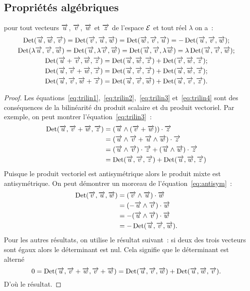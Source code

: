 \subsection{Propriétés algébriques}
\begin{prop}
  pour tout vecteurs \(\vu\), \(\vv\), \(\vw\) et \( \vz\) de l'espace \(\E\) 
  et tout réel \(\lambda\) on a~:
  \begin{gather}
    \Det(\vu, \vw, \vv) = \Det(\vv, \vu, \vw)=\Det(\vw, \vv, \vu) = -\Det(\vu, 
    \vv, \vw) \label{eq:antisym};\\
    \Det(\lambda\vu, \vv, \vw) = \Det(\vu, \lambda\vv, \vw) = \Det(\vu, \vv, 
    \lambda\vw) = \lambda\Det(\vu, \vv, \vw)\label{eq:trilin1};\\
    \Det(\vu + \vv, \vw, \vz) = \Det(\vu, \vw, \vz) + \Det(\vv, \vw, \vz) 
    \label{eq:trilin2};\\
    \Det(\vu, \vv + \vw, \vz) = \Det(\vu, \vv, \vz) + \Det(\vu, \vw, \vz) 
    \label{eq:trilin3};\\
    \Det(\vu, \vv, \vw + \vz) = \Det(\vu, \vv, \vw) + \Det(\vu, \vv, \vz) 
    \label{eq:trilin4}.
  \end{gather}
\end{prop}

\begin{proof}
  Les équations~\eqref{eq:trilin1},~\eqref{eq:trilin2},~\eqref{eq:trilin3} 
  et~\eqref{eq:trilin4} sont des conséquences de la bilinéarité du produit 
  scalaire et du produit vectoriel. Par exemple, on peut montrer 
  l'équation~\eqref{eq:trilin3}~:
  \begin{align}
    \Det(\vu, \vv + \vw, \vz)
    & = (\vu\wedge(\vv + \vw))\cdot\vz\\
    & = (\vu\wedge\vv + \vu\wedge\vw)\cdot\vz\\
    & = (\vu\wedge\vv)\cdot\vz + (\vu\wedge\vw)\cdot\vz\\
    & = \Det(\vu, \vv, \vz) + \Det(\vu, \vw, \vz)
  \end{align}
  Puisque le produit vectoriel est antisymétrique alors le produit mixte est 
  antisymétrique. On peut démontrer un morceau de 
  l'équation~\eqref{eq:antisym}~:
  \begin{align}
    \Det(\vv, \vu, \vw)& =(\vv\wedge\vu)\cdot\vw\\
                       & =(-\vu\wedge\vv)\cdot\vw\\
                       & =-(\vu\wedge\vv)\cdot\vw\\
                       & =-\Det(\vu, \vv, \vw).
  \end{align}
  Pour les autres résultats, on utilise le résultat suivant~: si deux des trois 
  vecteurs sont égaux alors le déterminant est nul. Cela signifie que le 
  déterminant est alterné
  \begin{equation}
    0 = \Det(\vu, \vv + \vw, \vv + \vw) = \Det(\vu, \vv, \vw) + \Det(\vu, \vw, 
    \vv).
  \end{equation}
  D'où le résultat.
\end{proof}

